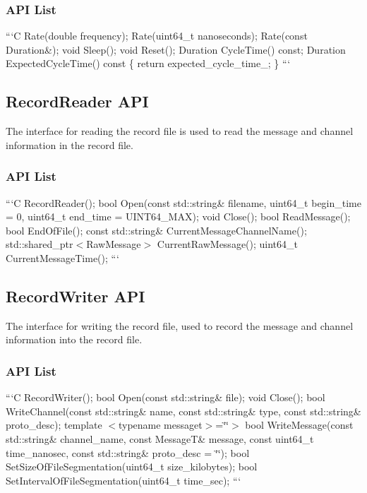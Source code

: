 {\ttfamily \subsubsection*{A\-P\-I List}}

{\ttfamily }

{\ttfamily ```\-C Rate(double frequency); Rate(uint64\-\_\-t nanoseconds); Rate(const Duration\&); void Sleep(); void Reset(); Duration Cycle\-Time() const; Duration Expected\-Cycle\-Time() const \{ return expected\-\_\-cycle\-\_\-time\-\_\-; \} ```}

{\ttfamily \subsection*{Record\-Reader A\-P\-I}}

{\ttfamily  The interface for reading the record file is used to read the message and channel information in the record file.}

{\ttfamily \subsubsection*{A\-P\-I List}}

{\ttfamily }

{\ttfamily ```\-C Record\-Reader(); bool Open(const std\-::string\& filename, uint64\-\_\-t begin\-\_\-time = 0, uint64\-\_\-t end\-\_\-time = U\-I\-N\-T64\-\_\-\-M\-A\-X); void Close(); bool Read\-Message(); bool End\-Of\-File(); const std\-::string\& Current\-Message\-Channel\-Name(); std\-::shared\-\_\-ptr$<$\-Raw\-Message$>$ Current\-Raw\-Message(); uint64\-\_\-t Current\-Message\-Time(); ```}

{\ttfamily \subsection*{Record\-Writer A\-P\-I}}

{\ttfamily  The interface for writing the record file, used to record the message and channel information into the record file.}

{\ttfamily \subsubsection*{A\-P\-I List}}

{\ttfamily }

{\ttfamily ```\-C Record\-Writer(); bool Open(const std\-::string\& file); void Close(); bool Write\-Channel(const std\-::string\& name, const std\-::string\& type, const std\-::string\& proto\-\_\-desc); template $<$typename messaget$>$=\char`\"{}\char`\"{}$>$ bool Write\-Message(const std\-::string\& channel\-\_\-name, const Message\-T\& message, const uint64\-\_\-t time\-\_\-nanosec, const std\-::string\& proto\-\_\-desc = \char`\"{}\char`\"{}); bool Set\-Size\-Of\-File\-Segmentation(uint64\-\_\-t size\-\_\-kilobytes); bool Set\-Interval\-Of\-File\-Segmentation(uint64\-\_\-t time\-\_\-sec); ``` }